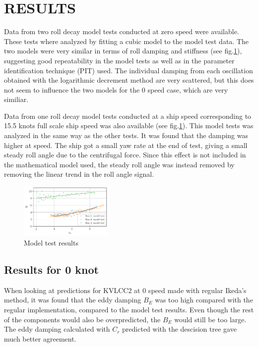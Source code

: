 \section*{RESULTS}\label{sec:results}

Data from two roll decay model tests conducted at zero speed were
available. These tests where analyzed by fitting a cubic model to the model test data. The two models were very similar in terms of roll damping and stiffness (see fig.\ref{fig:mdl}), suggesting
good repeatability in the model tests as well as in the parameter
identification technique (PIT) used. The individual damping from each oscillation obtained with the logarithmic decrement method are very scattered, but this does not seem to influence the two models for the 0 speed case, which are very similiar.


Data from one roll decay model tests conducted at a ship speed corresponding to 15.5 knots full scale ship speed was also available (see fig.\ref{fig:mdl}). This model tests was analyzed in the same way as the other tests. It was found that the damping was higher at speed. The ship got a small yaw rate at the end of test, giving a small steady roll angle due to the centrifugal force. Since this effect is not included in the mathematical
model used, the steady roll angle was instead removed by removing the linear trend in the roll angle signal.

    \begin{figure}[h]
        \begin{center}
        \includegraphics[width = 0.4\textwidth]{figures/mdl.pdf}
        \end{center}
        \vspace{-1cm}
        \caption{Model test results}
        \label{fig:mdl}
    \end{figure}
    
\subsection*{Results for 0 knot}\label{knots}

When looking at predictions for KVLCC2 at 0 speed made with regular Ikeda's method, it was found that the eddy damping $B_E$ was too high compared with the regular implementation, compared to the model test results. Even though the rest of the components would also be overpredicted, the $B_E$ would still be too large. The eddy damping calculated with $C_r$ predicted with the descision tree gave much better agreement.

